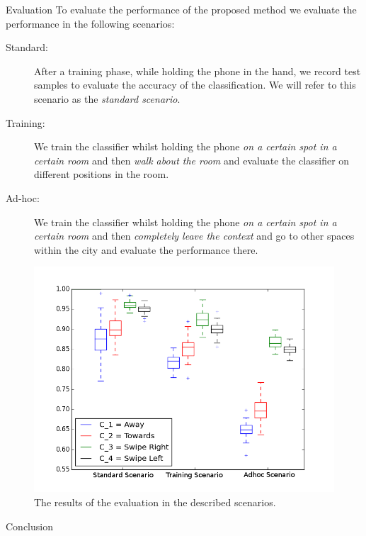 \documentclass[final,hyperref={pdfpagelabels=false}]{beamer}
\begin{document}
\begin{frame}[t]
\begin{columns}[t]
\begin{column}{.465\textwidth}
\begin{block}{Evaluation}
To evaluate the performance of the proposed method we evaluate the performance in the following scenarios:
\begin{description}
\item[Standard: ] After a training phase, while holding the phone in the hand, we record test samples to evaluate the accuracy of the classification. 
We will refer to this scenario as the \emph{standard scenario}.
\item[Training: ] We train the classifier whilst holding the phone \emph{on a certain spot in a certain room} and then \emph{walk about the room} and evaluate the classifier on different positions in the room.
\item[Ad-hoc:  ] We train the classifier whilst holding the phone \emph{on a certain spot in a certain room} and then \emph{completely leave the context} and go to other spaces within the city and evaluate the performance there. 
\end{description}


\begin{figure}
\includegraphics[width=0.9\linewidth]{./pics/boxcompare}
\caption{The results of the evaluation in the described scenarios.}
\end{figure}

\end{block}


\begin{block}{Conclusion}


\end{block}
\end{column}
\end{columns}
\end{frame}
\end{document}
